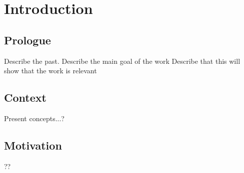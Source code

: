 \chapter{Introduction} %
\label{chapter:introduction}


\section{Prologue} %
\label{sec:prologue}

Describe the past.
Describe the main goal of the work
Describe that this will show that the work is relevant



\section{Context} %
\label{sec:context}

Present concepts...?




\section{Motivation}
\label{sec:motivation}

??